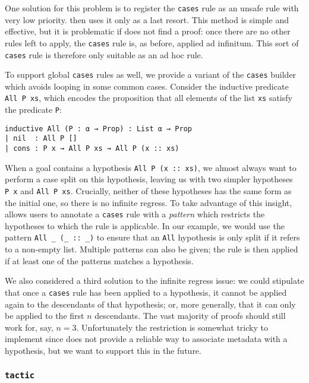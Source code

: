 One solution for this problem is to register the \texttt{cases} rule as an unsafe rule with very low priority.
\Aesop{} then uses it only as a last resort.
This method is simple and effective, but it is problematic if \Aesop{} does not find a proof: once there are no other rules left to apply, the \texttt{cases} rule is, as before, applied ad infinitum.
This sort of \texttt{cases} rule is therefore only suitable as an ad hoc rule.

To support global \texttt{cases} rules as well, we provide a variant of the \texttt{cases} builder which avoids looping in some common cases.
Consider the inductive predicate \texttt{All~P~xs}, which encodes the proposition that all elements of the list \texttt{xs} satisfy the predicate \texttt{P}:
\begin{lstlisting}
inductive All (P : α → Prop) : List α → Prop
| nil  : All P []
| cons : P x → All P xs → All P (x :: xs)
\end{lstlisting}
When a goal contains a hypothesis \texttt{All P (x~::~xs)}, we almost always want to perform a case split on this hypothesis, leaving us with two simpler hypotheses \texttt{P~x} and \texttt{All~P~xs}.
Crucially, neither of these hypotheses has the same form as the initial one, so there is no infinite regress.
To take advantage of this insight, \Aesop{} allows users to annotate a \texttt{cases} rule with a \emph{pattern} which restricts the hypotheses to which the rule is applicable.
In our example, we would use the pattern \texttt{All \_ (\_~::~\_)} to ensure that an \texttt{All} hypothesis is only split if it refers to a non-empty list.
Multiple patterns can also be given; the rule is then applied if at least one of the patterns matches a hypothesis.

We also considered a third solution to the infinite regress issue: we could stipulate that once a \texttt{cases} rule has been applied to a hypothesis, it cannot be applied again to the descendants of that hypothesis; or, more generally, that it can only be applied to the first $n$ descendants.
The vast majority of proofs should still work for, say, $n = 3$.
Unfortunately the restriction is somewhat tricky to implement since \Lean{} does not provide a reliable way to associate metadata with a hypothesis, but we want to support this in the future.


\subsubsection{\texttt{tactic}}

